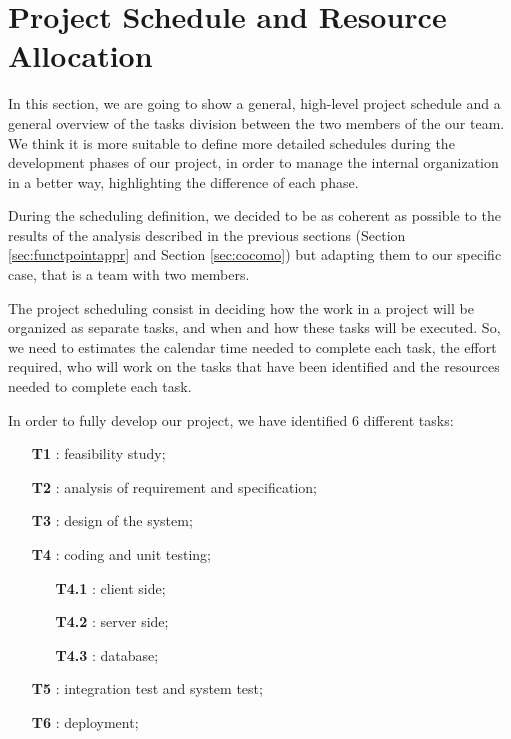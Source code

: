 \section{Project Schedule and Resource Allocation} \label{sec:psara}


In this section, we are going to show a general, high-level project schedule and a general overview of the tasks division between the two members of the our team. We think it is more suitable to define more detailed schedules during the development phases of our project, in order to manage the internal organization in a better way, highlighting the difference of each phase.

During the scheduling definition, we decided to be as coherent as possible to the results of the analysis described in the previous sections (Section \ref{sec:functpointappr} and Section \ref{sec:cocomo}) but adapting them to our specific case, that is a team with two members.

The project scheduling consist in deciding how the work in a project will be organized as separate tasks, and when and how these tasks will be executed.
So, we need to estimates the calendar time needed to complete each task, the effort required, who will work on the tasks that have been identified and the resources needed to complete each task.

In order to fully develop our project, we have identified $6$ different tasks:

\begin{itemize}

\item[\textbf{T1}]: feasibility study;

\item[\textbf{T2}]: analysis of requirement and specification;

\item[\textbf{T3}]: design of the system;

\item[\textbf{T4}]: coding and unit testing;

\begin{itemize}

\item[\textbf{T4.1}]: client side;

\item[\textbf{T4.2}]: server side;

\item[\textbf{T4.3}]: database;

\end{itemize}

\item[\textbf{T5}]: integration test and system test;

\item[\textbf{T6}]: deployment;

\end{itemize}

